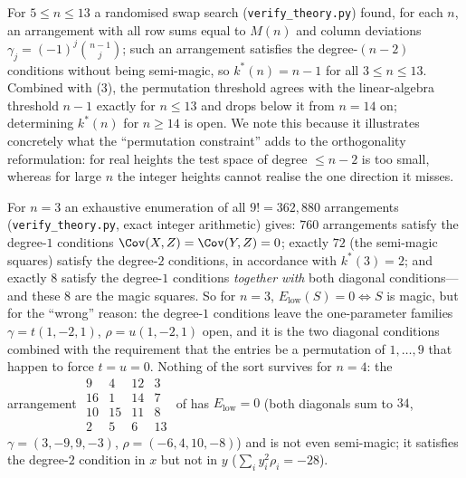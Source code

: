 \begin{remark}
\label{rem:kstar_search}
For $5\le n\le13$ a randomised swap search (\texttt{verify\_theory.py}) found, for each $n$, an arrangement
with all row sums equal to $M(n)$ and column deviations $\gamma_j=(-1)^{j}\binom{n-1}{j}$; such an arrangement
satisfies the degree-$(n-2)$ conditions without being semi-magic, so $k^{*}(n)=n-1$ for all $3\le n\le13$.
Combined with (3), the permutation threshold agrees with the linear-algebra threshold
$n-1$ exactly for $n\le13$ and drops below it from $n=14$ on; determining $k^{*}(n)$ for $n\ge14$ is open.
We note this because it illustrates concretely what the ``permutation constraint'' adds to the orthogonality
reformulation: for real heights the test space of degree $\le n-2$ is too small, whereas for large $n$ the integer
heights cannot realise the one direction it misses.
\end{remark}

\begin{remark}[Why the low-mode energy appeared to work for $n=3$]
\label{rem:n3_lowmode}
For $n=3$ an exhaustive enumeration of all $9!=362{,}880$ arrangements (\texttt{verify\_theory.py}, exact integer arithmetic) gives:
$760$ arrangements satisfy the degree-$1$ conditions $\Cov(X,Z)=\Cov(Y,Z)=0$; exactly $72$ (the semi-magic squares)
satisfy the degree-$2$ conditions, in accordance with $k^{*}(3)=2$; and exactly $8$ satisfy the degree-$1$ conditions
\emph{together with} both diagonal conditions---and these $8$ are the magic squares.  So for $n=3$,
$E_{\mathrm{low}}(S)=0\iff S$ is magic, but for the ``wrong'' reason: the degree-$1$ conditions leave the one-parameter
families $\gamma=t(1,-2,1)$, $\rho=u(1,-2,1)$ open, and it is the two diagonal conditions combined with the requirement
that the entries be a permutation of $1,\dots,9$ that happen to force $t=u=0$.  Nothing of the sort survives for $n=4$:
the arrangement $\begin{smallmatrix}9&4&12&3\\16&1&14&7\\10&15&11&8\\2&5&6&13\end{smallmatrix}$ of 
has $E_{\mathrm{low}}=0$ (both diagonals sum to $34$, $\gamma=(3,-9,9,-3)$, $\rho=(-6,4,10,-8)$) and is not even
semi-magic; it satisfies the degree-$2$ condition in $x$ but not in $y$ ($\sum_iy_i^{2}\rho_i=-28$).
\end{remark}

